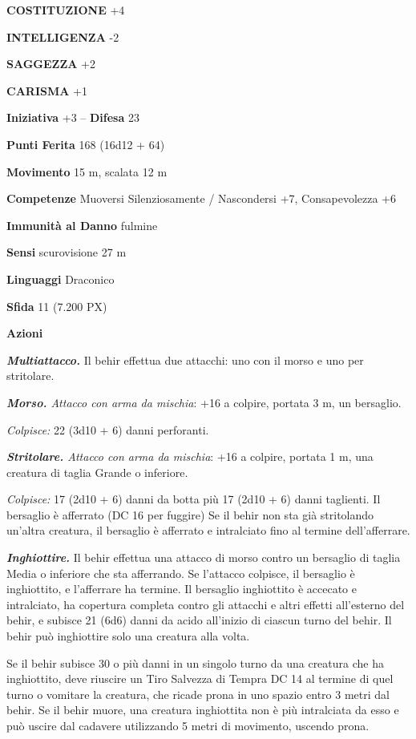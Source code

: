 \begin{multicols}{2}
	\textbf{COSTITUZIONE} +4

	\textbf{INTELLIGENZA} -2

	\textbf{SAGGEZZA} +2

	\textbf{CARISMA} +1

	\textbf{Iniziativa} +3 -- \textbf{Difesa} 23

	\textbf{Punti Ferita} 168 (16d12 + 64)

	\textbf{Movimento} 15 m, scalata 12 m

	\textbf{Competenze} Muoversi Silenziosamente / Nascondersi +7, Consapevolezza +6

	\textbf{Immunità al Danno} fulmine

	\textbf{Sensi} scurovisione 27 m

	\textbf{Linguaggi} Draconico

	\textbf{Sfida} 11 (7.200 PX)

	\textbf{Azioni}

	\textit{\textbf{Multiattacco.}} Il behir effettua due attacchi: uno con il morso e uno per stritolare.

	\textit{\textbf{Morso.} Attacco con arma da mischia}: +16 a colpire, portata 3 m, un bersaglio.

	\textit{Colpisce:} 22 (3d10 + 6) danni perforanti.

	\textit{\textbf{Stritolare.} Attacco con arma da mischia}: +16 a colpire, portata 1 m, una creatura di taglia Grande o inferiore.

	\textit{Colpisce:} 17 (2d10 + 6) danni da botta più 17 (2d10 + 6) danni taglienti. Il bersaglio è afferrato (DC 16 per fuggire) Se il behir non sta già stritolando un'altra creatura, il bersaglio è afferrato e intralciato fino al termine dell'afferrare.

	\textit{\textbf{Inghiottire.}} Il behir effettua una attacco di morso contro un bersaglio di taglia Media o inferiore che sta afferrando. Se l'attacco colpisce, il bersaglio è inghiottito, e l'afferrare ha termine. Il bersaglio inghiottito è accecato e intralciato, ha copertura completa contro gli attacchi e altri effetti all'esterno del behir, e subisce 21 (6d6) danni da acido all'inizio di ciascun turno del behir. Il behir può inghiottire solo una creatura alla volta.

	Se il behir subisce 30 o più danni in un singolo turno da una creatura che ha inghiottito, deve riuscire un Tiro Salvezza di Tempra DC 14 al termine di quel turno o vomitare la creatura, che ricade prona in uno spazio entro 3 metri dal behir. Se il behir muore, una creatura inghiottita non è più intralciata da esso e può uscire dal cadavere utilizzando 5 metri di movimento, uscendo prona.


\end{multicols}
